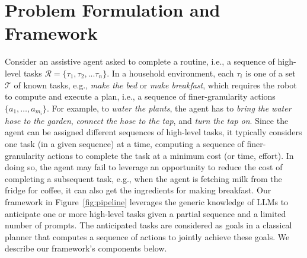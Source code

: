\section{Problem Formulation and Framework}
\vspace{-3pt}
\label{sec:problem}
Consider an assistive agent asked to complete a routine, i.e., a sequence of high-level tasks $\mathcal{R} = \{\tau_1, \tau_2,...\tau_n\}$. %
In a household environment, each $\tau_i$ is one of a set $\mathcal{T}$ of known tasks, e.g., \textit{make the bed} or \textit{make breakfast}, which requires the robot to compute and execute a plan, i.e., a sequence of finer-granularity actions $\{a_1, \ldots, a_{m_i}\}$. For example, to \textit{water the plants}, the agent has to \textit{bring the water hose to the garden}, \textit{connect the hose to the tap}, and \textit{turn the tap on}. %
Since the agent can be assigned different sequences of high-level tasks, it typically considers one task (in a given sequence) at a time, computing a sequence of finer-granularity actions to complete the task at a minimum cost (or time, effort). In doing so, the agent may fail to leverage an opportunity to reduce the cost of completing a subsequent task, e.g., when the agent is fetching milk from the fridge for coffee, it can also get the ingredients for making breakfast. Our framework in Figure~\ref{fig:pipeline} leverages the generic knowledge of LLMs to anticipate one or more high-level tasks given a partial sequence and a limited number of prompts. The anticipated tasks are considered as goals in a classical planner that computes a sequence of actions to jointly achieve these goals. We describe our framework's components below.

